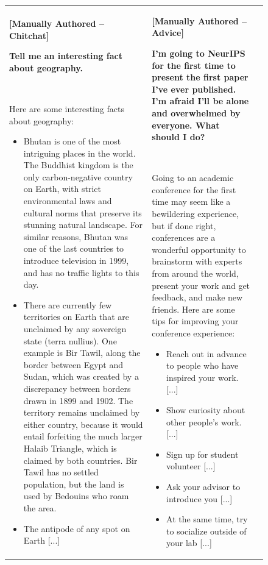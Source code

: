 \begin{figure}[p]
\begin{tabular}{@{}p{}p{}p{}@{}}
    \\
    \midrule
    \textbf{[Manually Authored -- Chitchat]}
    
    \textcolor[HTML]{3078BE}{\textbf{Tell me an interesting fact about geography.}}

    ~
    
    Here are some interesting facts about geography:
    \begin{itemize}[leftmargin=8pt]
        \item Bhutan is one of the most intriguing places in the world. The Buddhist kingdom is the only carbon-negative country on Earth, with strict environmental laws and cultural norms that preserve its stunning natural landscape. For similar reasons, Bhutan was one of the last countries to introduce television in 1999, and has no traffic lights to this day.
        \item There are currently few territories on Earth that are unclaimed by any sovereign state (terra nullius). One example is Bir Tawil, along the border between Egypt and Sudan, which was created by a discrepancy between borders drawn in 1899 and 1902. The territory remains unclaimed by either country, because it would entail forfeiting the much larger Halaib Triangle, which is claimed by both countries. Bir Tawil has no settled population, but the land is used by Bedouins who roam the area.
        \item The antipode of any spot on Earth \textcolor[HTML]{808080}{[...]}
    \end{itemize} 
    &
    \textbf{[Manually Authored -- Advice]}
    
    \textcolor[HTML]{3078BE}{\textbf{I'm going to NeurIPS for the first time to present the first paper I've ever published. I'm afraid I'll be alone and overwhelmed by everyone. What should I do?}}
    
    ~
    
    Going to an academic conference for the first time may seem like a bewildering experience, but if done right, conferences are a wonderful opportunity to brainstorm with experts from around the world, present your work and get feedback, and make new friends. Here are some tips for improving your conference experience:
    \begin{itemize}[leftmargin=8pt]
    \item Reach out in advance to people who have inspired your work. \textcolor[HTML]{808080}{[...]}
    \item Show curiosity about other people's work. \textcolor[HTML]{808080}{[...]}
    \item Sign up for student volunteer \textcolor[HTML]{808080}{[...]}
    \item Ask your advisor to introduce you \textcolor[HTML]{808080}{[...]}
    \item At the same time, try to socialize outside of your lab \textcolor[HTML]{808080}{[...]}
    \end{itemize}
    

\end{tabular}
\end{figure}
